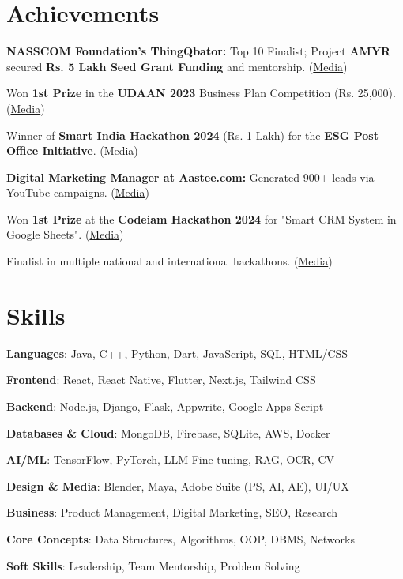 \documentclass[a4paper]{article}
\newcommand{\resumeItem}[2]{
  \item\small{
    \textbf{#1}{: #2 \vspace{-2pt}}
  }
}
\newcommand{\resumeSubItem}[2]{\resumeItem{#1}{#2}\vspace{-4pt}}
\begin{document}
\section{Achievements}
\begin{resumeSubHeadingList}
    \item{\textbf{NASSCOM Foundation's ThingQbator:} Top 10 Finalist; Project \textbf{AMYR} secured \textbf{Rs. 5 Lakh Seed Grant Funding} and mentorship. (\href{https://sai.fhaida.com/\#achievement-1}{Media})}
    \item{Won \textbf{1st Prize} in the \textbf{UDAAN 2023} Business Plan Competition (Rs. 25,000). (\href{https://sai.fhaida.com/\#achievement-2}{Media})}
    \item{Winner of \textbf{Smart India Hackathon 2024} (Rs. 1 Lakh) for the \textbf{ESG Post Office Initiative}. (\href{https://sai.fhaida.com/\#achievement-3}{Media})}
    \item{\textbf{Digital Marketing Manager at Aastee.com:} Generated 900+ leads via YouTube campaigns. (\href{https://sai.fhaida.com/\#achievement-4}{Media})}
    \item{Won \textbf{1st Prize} at the \textbf{Codeiam Hackathon 2024} for "Smart CRM System in Google Sheets". (\href{https://sai.fhaida.com/\#achievement-5}{Media})}
    \item{Finalist in multiple national and international hackathons. (\href{https://sai.fhaida.com/\#achievement-6}{Media})}
\end{resumeSubHeadingList}

\section{Skills}
\begin{multicols}{3}
    \begin{resumeSubHeadingList}
        \resumeSubItem{Languages}{Java, C++, Python, Dart, JavaScript, SQL, HTML/CSS}
        \resumeSubItem{Frontend}{React, React Native, Flutter, Next.js, Tailwind CSS}
        \resumeSubItem{Backend}{Node.js, Django, Flask, Appwrite, Google Apps Script}
        \resumeSubItem{Databases \& Cloud}{MongoDB, Firebase, SQLite, AWS, Docker}
        \resumeSubItem{AI/ML}{TensorFlow, PyTorch, LLM Fine-tuning, RAG, OCR, CV}
        \resumeSubItem{Design \& Media}{Blender, Maya, Adobe Suite (PS, AI, AE), UI/UX}
        \resumeSubItem{Business}{Product Management, Digital Marketing, SEO, Research}
        \resumeSubItem{Core Concepts}{Data Structures, Algorithms, OOP, DBMS, Networks}
        \resumeSubItem{Soft Skills}{Leadership, Team Mentorship, Problem Solving}
    \end{resumeSubHeadingList}
\end{multicols}
\end{document}
